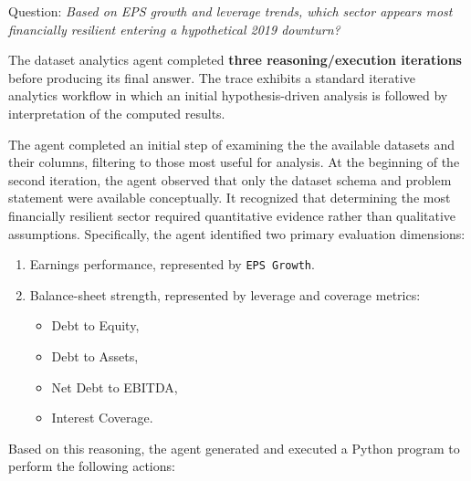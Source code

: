 \vspace{20pt}

Question: \textit{Based on EPS growth and leverage trends, which sector appears most financially resilient entering a hypothetical 2019 downturn?}

\vspace{20pt}

The dataset analytics agent completed \textbf{three reasoning/execution iterations} before producing its final answer. The trace exhibits a standard iterative analytics workflow in which an initial hypothesis-driven analysis is followed by interpretation of the computed results.


The agent completed an initial step of examining the the available datasets and their columns, filtering to those most useful for analysis. At the beginning of the second iteration, the agent observed that only the dataset schema and problem statement were available conceptually. It recognized that determining the most financially resilient sector required quantitative evidence rather than qualitative assumptions. Specifically, the agent identified two primary evaluation dimensions:

\begin{enumerate}
  \item Earnings performance, represented by \texttt{EPS Growth}.
  \item Balance-sheet strength, represented by leverage and coverage metrics:
    \begin{itemize}
      \item Debt to Equity,
      \item Debt to Assets,
      \item Net Debt to EBITDA,
      \item Interest Coverage.
    \end{itemize}
\end{enumerate}

Based on this reasoning, the agent generated and executed a Python program to perform the following actions:

